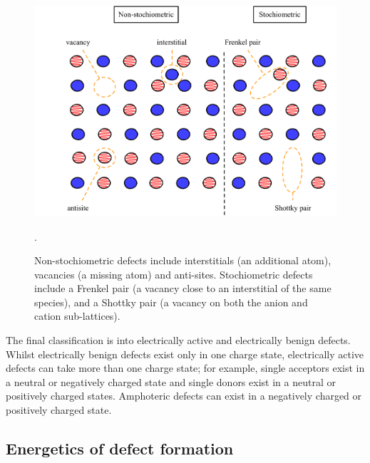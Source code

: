 \begin{figure}[h]
\centering
  \includegraphics[width=0.8\columnwidth]{figures/ch3/classification.png}
  \caption[Classification of crystal point-defects]{Non-stochiometric defects include interstitials (an additional atom), vacancies (a missing atom) and anti-sites. Stochiometric defects include a Frenkel pair (a vacancy close to an interstitial of the same species), and a Shottky pair (a vacancy on both the anion and cation sub-lattices).}
  \label{classification} . %
\end{figure}

The final classification is into electrically active and electrically benign defects. Whilst electrically benign defects exist only in one charge state, electrically active defects can take more than one charge state; for example, single acceptors exist in a neutral or negatively charged state and single donors exist in a neutral or positively charged states. Amphoteric defects can exist in a negatively charged or positively charged state.

\subsection{Energetics of defect formation} \label{defectformation}

